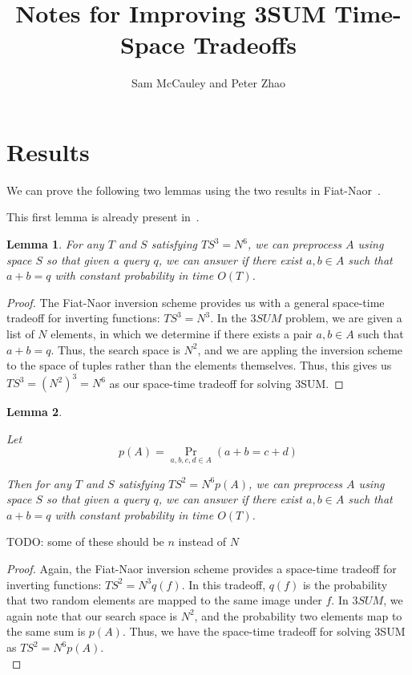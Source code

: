 \documentclass{article}
\title{Notes for Improving 3SUM Time-Space Tradeoffs}
\author{Sam McCauley and Peter Zhao}
\date{}
\newtheorem{lemma}{Lemma}
\begin{document}
\maketitle

\section{Results}%
\label{sec:results}



We can prove the following two lemmas using the two results in Fiat-Naor~\cite{FiatNaor00}.

This first lemma is already present in~\cite{GolovnevGuHo19}.

\begin{lemma}
\label{lem:cubic}
For any $T$ and $S$ satisfying $TS^3 = N^6$, we can preprocess $A$ using space $S$ so that given a query $q$, we can answer if there exist $a,b\in A$ such that $a + b = q$ with constant probability in time $O(T)$.
\end{lemma}

\begin{proof}
The Fiat-Naor inversion scheme provides us with a general space-time tradeoff for inverting functions: $TS^3 = N^3$. In the $3SUM$ problem, we are given a list of $N$ elements, in which we determine if there exists a pair $a,b \in A$ such that $a+b = q$. Thus, the search space is $N^2$, and we are appling the inversion scheme to the space of tuples rather than the elements themselves. Thus, this gives us $TS^3 = (N^2)^3 = N^6$ as our space-time tradeoff for solving 3SUM.
\end{proof}


\begin{lemma}
\label{lem:output-sensitive}

Let 
\[
  p(A) = \Pr_{a,b,c,d\in A}(a + b = c + d)
\]

Then for any $T$ and $S$ satisfying $TS^2 = N^6 p(A)$, we can preprocess $A$ using space $S$ so that given a query $q$, we can answer if there exist $a,b\in A$ such that $a + b = q$ with constant probability in time $O(T)$.
\end{lemma}

TODO: some of these should be $n$ instead of $N$

\begin{proof}
Again, the Fiat-Naor inversion scheme provides a space-time tradeoff for inverting functions: $TS^2 = N^3q(f)$. In this tradeoff, $q(f)$ is the probability that two random elements are mapped to the same image under $f$. In $3SUM$, we again note that our search space is $N^2$, and the probability two elements map to the same sum is $p(A)$. Thus, we have the space-time tradeoff for solving 3SUM as $TS^2 = N^6p(A)$. \\
\end{proof}
\end{document}
